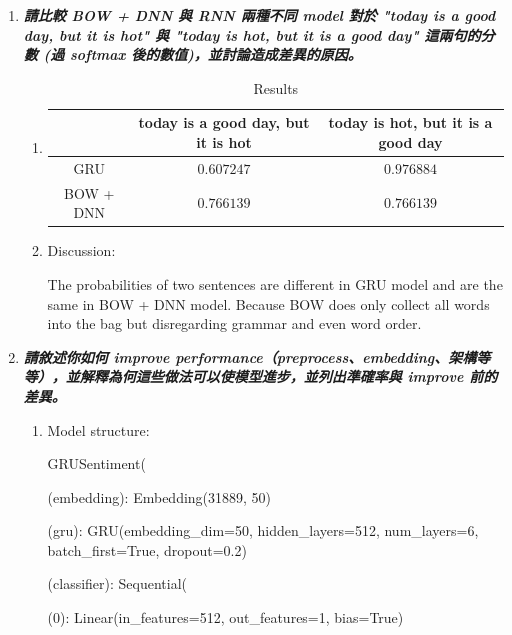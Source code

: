 \documentclass[a4paper,11pt]{article}
\begin{document}
\begin{enumerate}
	\item \textit{\textbf{請比較 BOW + DNN 與 RNN 兩種不同 model 對於 "today is a good day, but it is hot" 與 "today is hot, but it is a good day" 這兩句的分數 (過 softmax 後的數值)，並討論造成差異的原因。}}\\

	\begin{enumerate}

		\item 
			\begin{table}[htp]
				\begin{center}
					\begin{tabular}{ | c | c | c |}
					  	\hline
				  		& today is a good day, but it is hot & today is hot, but it is a good day\\[0.5ex] 
				  		\hline \hline
				  		GRU & $0.607247$ & $0.976884$ \\[0.2ex]
				  		\hline
				  		BOW + DNN & $0.766139$ & $0.766139$ \\[0.2ex]
				  		\hline
					\end{tabular}
					\caption{Results}
				\end{center}
			\end{table}

		\item Discussion:

			The probabilities of two sentences are different in GRU model and are the same in BOW + DNN model. Because BOW does only collect all words into the bag but disregarding grammar and even word order.

	\end{enumerate}

\newpage
	
	\item \textit{\textbf{請敘述你如何 improve performance（preprocess、embedding、架構等等），並解釋為何這些做法可以使模型進步，並列出準確率與 improve 前的差異。}}

	\begin{enumerate}
		\item Model structure:

			GRUSentiment(

  			\quad (embedding): Embedding(31889, 50)
  
  			\quad (gru): GRU(embedding\_dim=50, hidden\_layers=512, num\_layers=6, batch\_first=True, dropout=0.2)

  			\quad (classifier): Sequential(

    		\quad \quad (0): Linear(in\_features=512, out\_features=1, bias=True)


\end{enumerate}
\end{enumerate}
\end{document}
